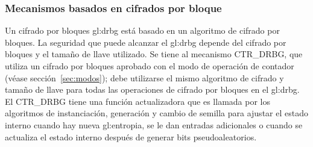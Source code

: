 %
%
\subsubsection{Mecanismos basados en cifrados por bloque}

Un cifrado por bloques \gls{gl:drbg} está basado en un algoritmo de cifrado por
bloques. La seguridad que puede alcanzar el \gls{gl:drbg} depende del cifrado
por bloques y el tamaño de llave utilizado. Se tiene al mecanismo CTR\_DRBG,
que utiliza un cifrado por bloques aprobado con el modo de operación de
contador (véase sección~\ref{sec:modos}); debe utilizarse el mismo algoritmo
de cifrado y tamaño de llave para todas las operaciones de cifrado por bloques
en el \gls{gl:drbg}. El CTR\_DRBG tiene una función actualizadora que es llamada
por los algoritmos de instanciación, generación y cambio de semilla para ajustar
el estado interno cuando hay nueva \gls{gl:entropia}, se le dan entradas
adicionales o cuando se actualiza el estado interno después de generar bits
pseudoaleatorios.
